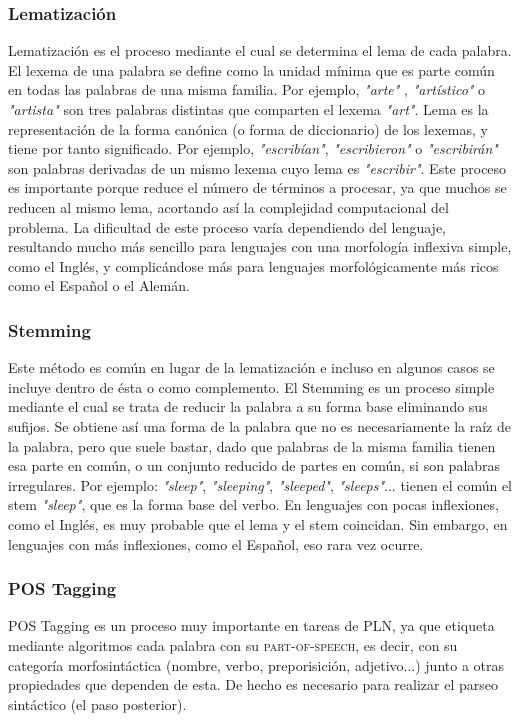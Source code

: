 \subsubsection{Lematización}
Lematización es el proceso mediante el cual se determina el lema de cada palabra. El lexema de una palabra se define como la unidad mínima que es parte común en todas las palabras de una misma familia. Por ejemplo, \textsl{"arte"} , \textsl{"artístico"} o \textsl{"artista"} son tres palabras distintas que comparten el lexema \textsl{"art"}. Lema es la representación de la forma canónica (o forma de diccionario) de los lexemas, y tiene por tanto significado. Por ejemplo, \textsl{"escribían"}, \textsl{"escribieron"} o \textsl{"escribirán"} son palabras derivadas de un mismo lexema cuyo lema es \textsl{"escribir"}.\newline
Este proceso es importante porque reduce el número de términos a procesar, ya que muchos se reducen al mismo lema, acortando así la complejidad computacional del problema. La dificultad de este proceso varía dependiendo del lenguaje, resultando mucho más sencillo para lenguajes con una morfología inflexiva simple, como el Inglés, y complicándose más para lenguajes morfológicamente más ricos como el Español o el Alemán.  
\subsubsection{Stemming} 
Este método es común en lugar de la lematización e incluso en algunos casos se incluye dentro de ésta o como complemento. El Stemming es un proceso simple mediante el cual se trata de reducir la palabra a su forma base eliminando sus sufijos. Se obtiene así una forma de la palabra que no es necesariamente la raíz de la palabra, pero que suele bastar, dado que palabras de la misma familia tienen esa parte en común, o un conjunto reducido de partes en común, si son palabras irregulares.  Por ejemplo: \textsl{"sleep"}, \textsl{"sleeping"}, \textsl{"sleeped"}, \textsl{"sleeps"}... tienen el común el stem \textsl{"sleep"}, que es la forma base del verbo.
En lenguajes con pocas inflexiones, como el Inglés, es muy probable que el lema y el stem coincidan. Sin embargo, en lenguajes con más inflexiones, como el Español, eso rara vez ocurre.  
\subsubsection{POS Tagging}
POS Tagging es un proceso muy importante en tareas de PLN, ya que etiqueta mediante algoritmos cada palabra con su \textsc{part-of-speech}, es decir, con su categoría morfosintáctica (nombre, verbo, preporisición, adjetivo...) junto a otras propiedades que dependen de esta. De hecho es necesario para realizar el parseo sintáctico (el paso posterior).\newline

